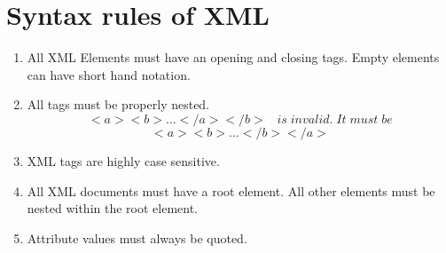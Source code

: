 \section{Syntax rules of XML}
\begin{enumerate}
	\item All XML Elements must have an opening and closing tags. Empty elements can have short hand notation.
	\item All tags must be properly nested.
	$$<a><b>...</a></b>\;\;\; is\; invalid.\; It\; must\; be$$
	$$<a><b>...</b></a>$$
	\item XML tags are highly case sensitive.
	\item All XML documents must have a root element. All other elements must be nested within the root element.
	\item Attribute values must always be quoted.
\end{enumerate}

